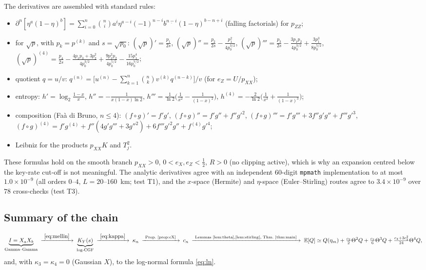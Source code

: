 \documentclass[11pt,a4paper]{article}
\theoremstyle{plain}
\theoremstyle{remark}
\begin{document}
The derivatives are assembled with standard rules:
\begin{itemize}
\item $\partial^n[\eta^a(1-\eta)^b]=\sum_{i=0}^{n}\binom ni a^{\underline i}\eta^{a-i}(-1)^{n-i}b^{\underline{n-i}}(1-\eta)^{b-n+i}$ (falling factorials) for $p_{ZZ}$;
\item for $\sqrt p$, with $p_k=p^{(k)}$ and $s=\sqrt{p_0}$:
$(\sqrt p)'=\tfrac{p_1}{2s}$,\;
$(\sqrt p)''=\tfrac{p_2}{2s}-\tfrac{p_1^2}{4p_0^{3/2}}$,\;
$(\sqrt p)'''=\tfrac{p_3}{2s}-\tfrac{3p_1p_2}{4p_0^{3/2}}+\tfrac{3p_1^3}{8p_0^{5/2}}$,\;
$(\sqrt p)^{(4)}=\tfrac{p_4}{2s}-\tfrac{4p_1p_3+3p_2^2}{4p_0^{3/2}}+\tfrac{9p_1^2p_2}{4p_0^{5/2}}-\tfrac{15p_1^4}{16p_0^{7/2}}$;
\item quotient $q=u/v$: $q^{(n)}=\big[u^{(n)}-\sum_{k=1}^{n}\binom nk v^{(k)}q^{(n-k)}\big]/v$ (for $e_Z=U/p_{XX}$);
\item entropy: $h'=\log_2\frac{1-x}{x}$, $h''=-\frac{1}{x(1-x)\ln2}$, $h'''=\frac1{\ln2}\big(\frac1{x^2}-\frac1{(1-x)^2}\big)$, $h^{(4)}=-\frac2{\ln2}\big(\frac1{x^3}+\frac1{(1-x)^3}\big)$;
\item composition (Fa\`a di Bruno, $n\le4$): $(f\!\circ\! g)'=f'g'$, $(f\!\circ\! g)''=f'g''+f''g'^2$, $(f\!\circ\! g)'''=f'g'''+3f''g'g''+f'''g'^3$, $(f\!\circ\! g)^{(4)}=f'g^{(4)}+f''(4g'g'''+3g''^2)+6f'''g'^2g''+f^{(4)}g'^4$;
\item Leibniz for the products $p_{XX}K$ and $T_j^2$.
\end{itemize}
These formulas hold on the smooth branch $p_{XX}>0$, $0<e_X,e_Z<\tfrac12$, $R>0$ (no clipping active), which is why an expansion centred below the key-rate cut-off is not meaningful.
The analytic derivatives agree with an independent 60-digit \texttt{mpmath} implementation to at most $1.0\times10^{-9}$ (all orders $0$--$4$, $L=20$--$160$~km; test T1), and the $x$-space (Hermite) and $\eta$-space (Euler--Stirling) routes agree to $3.4\times10^{-9}$ over $78$ cross-checks (test T3).

\subsection{Summary of the chain}
\[
\underbrace{I=X_aX_b}_{\text{Gamma--Gamma}}
\;\xrightarrow{\ \eqref{eq:mellin}\ }\;
\underbrace{K_Y(s)}_{\text{log-CGF}}
\;\xrightarrow{\ \eqref{eq:kappa}\ }\;
\kappa_n
\;\xrightarrow{\ \text{Prop.~\ref{prop:cX}}\ }\;
c_n
\;\xrightarrow{\ \text{Lemmas~\ref{lem:theta},\ref{lem:stirling}, Thm.~\ref{thm:main}}\ }\;
\mathbb E[Q]\simeq Q(\eta_m)+\tfrac{c_2}{2}\Theta^2Q+\tfrac{c_3}{6}\Theta^3Q+\tfrac{c_4+3c_2^2}{24}\Theta^4Q ,
\]
and, with $\kappa_3=\kappa_4=0$ (Gaussian $X$), to the log-normal formula \eqref{eq:ln}.
\end{document}
